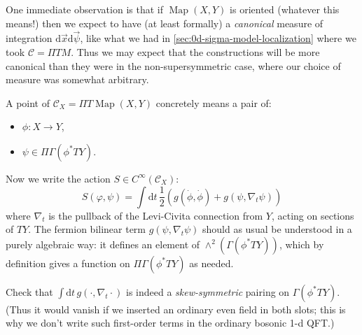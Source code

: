 \documentclass[12pt,letterpaper,reqno]{article}
\numberwithin{equation}{section}
\newcommand{\cC}{\ensuremath{\mathcal C}}
\newcommand{\R}{\ensuremath{\mathbb R}}
\newcommand{\half}{\ensuremath{\frac{1}{2}}}
\newcommand{\de}{\mathrm{d}}
\newcommand{\ti}[1]{\textit{#1}}
\DeclareMathOperator{\Map}{Map}
\begin{document}
One immediate observation is that if $\Map(X,Y)$ is oriented
(whatever this means!)
then we expect to have (at least formally) a \ti{canonical}
measure of integration $\de \vec{x} \de \vec{\psi}$, 
like what we had in \autoref{sec:0d-sigma-model-localization} 
where we took $\cC = \Pi T M$.
Thus we may expect that the constructions will be more canonical than
they were in the non-supersymmetric case, where our choice of
measure was somewhat arbitrary.

A point of $\cC_X = \Pi T \Map(X,Y)$ concretely means a pair of:
\begin{itemize}
 \item $\phi: X \to Y$,
 \item $\psi \in \Pi \Gamma(\phi^* TY)$.
\end{itemize}

Now we write the action $S \in C^\infty(\cC_X)$:
\begin{equation} \label{eq:1d-susy-action}
  S(\varphi,\psi) = \int \de t \, \half(g(\dot \phi, \dot \phi) + g(\psi, \nabla_t \psi))
\end{equation}
where $\nabla_t$ is the pullback of the Levi-Civita connection from $Y$, acting
on sections of $TY$.
The fermion bilinear term $g(\psi, \nabla_t \psi)$ should as
usual be understood in a purely algebraic way: it defines an element
of $\wedge^2(\Gamma(\phi^* TY))$, which by definition gives a function
on $\Pi \Gamma(\phi^* TY)$ as needed.

\begin{exercise} Check that $\int \de t\, g(\cdot, \nabla_t \cdot)$
is indeed a \ti{skew-symmetric} pairing on $\Gamma(\phi^* TY)$. 
(Thus it would vanish
if we inserted an ordinary even field in both slots; 
this is why we don't
write such first-order terms in the ordinary bosonic 1-d QFT.)
\end{exercise}
\end{document}
